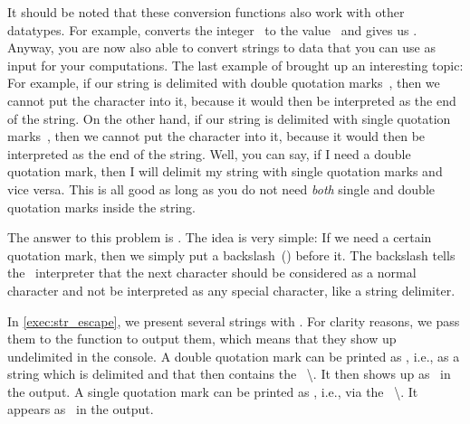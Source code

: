 It should be noted that these conversion functions also work with other datatypes.
For example,  converts the integer~ to the  value~ and  gives us .
Anyway, you are now also able to convert strings to data that you can use as input for your computations.%
%
\FloatBarrier%
\endhsection%
%
%
%
\label{sec:str:escaping}%
%
%
%
%
%
%
%
The last example of  brought up an interesting topic:
For example, if our string is delimited with double quotation marks~\pythonIdx{\textquotedbl\idxdots\textquotedbl}, then we cannot put the character  into it, because it would then be interpreted as the end of the string.
On the other hand, if our string is delimited with single quotation marks~\pythonIdx{\textquotesingle}, then we cannot put the character  into it, because it would then be interpreted as the end of the string.
Well, you can say, if I need a double quotation mark, then I will delimit my string with single quotation marks and vice versa.
This is all good as long as you do not need \emph{both} single and double quotation marks inside the string.

The answer to this problem is \emph{}.
The idea is very simple:
If we need a certain quotation mark, then we simply put a backslash~(\inQuotes{\textbackslash})\pythonIdx{\textbackslash} before it.
The backslash tells the \python\ interpreter that the next character should be considered as a normal character and not be interpreted as any special character, like a string delimiter.

In \cref{exec:str_escape}, we present several strings with .
For clarity reasons, we pass them to the  function to output them, which means that they show up undelimited in the console.
A double quotation mark can be printed as , i.e., as a string which is delimited and that then contains the ~{\textbackslash\textquotedbl}\pythonIdx{\textbackslash\textquotedbl}.
It then shows up as~ in the output.
A single quotation mark can be printed as , i.e., via the ~{\textbackslash\textquotesingle}\pythonIdx{\textbackslash\textquotesingle}.
It appears as~ in the output.

